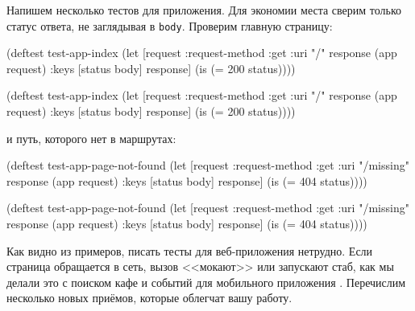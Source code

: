 \fi

Напишем несколько тестов для приложения. Для экономии места сверим только статус
ответа, не заглядывая в \verb|body|. Проверим главную страницу:

\ifx\DEVICETYPE\MOBILE

\begin{english}
  \begin{clojure}
(deftest test-app-index
  (let [request {:request-method :get
                 :uri "/"}
        response (app request)
        {:keys [status body]} response]
    (is (= 200 status))))
  \end{clojure}
\end{english}

\else

\begin{english}
  \begin{clojure}
(deftest test-app-index
  (let [request {:request-method :get :uri "/"}
        response (app request)
        {:keys [status body]} response]
    (is (= 200 status))))
  \end{clojure}
\end{english}

\fi

\noindent
и путь, которого нет в маршрутах:

\ifx\DEVICETYPE\MOBILE

\begin{english}
  \begin{clojure}
(deftest test-app-page-not-found
  (let [request {:request-method :get
                 :uri "/missing"}
        response (app request)
        {:keys [status body]} response]
    (is (= 404 status))))
  \end{clojure}
\end{english}

\else

\begin{english}
  \begin{clojure}
(deftest test-app-page-not-found
  (let [request {:request-method :get :uri "/missing"}
        response (app request)
        {:keys [status body]} response]
    (is (= 404 status))))
  \end{clojure}
\end{english}

\fi


Как видно из примеров, писать тесты для веб-приложения нетрудно. Если страница
обращается в сеть, вызов <<мокают>> или запускают стаб, как мы делали это с
поиском кафе и событий для мобильного приложения .
Перечислим несколько новых приёмов, которые облегчат вашу работу.

